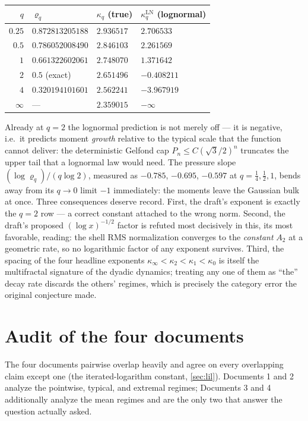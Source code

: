 \documentclass[11pt,oneside]{article}
\theoremstyle{definition}
\theoremstyle{remark}
\begin{document}
\begin{center}
\small
\begin{tabular}{@{}rlll@{}}
\toprule
$q$ & $\varrho_q$ & $\kappa_q$ (true) & $\kappa_q^{\mathrm{LN}}$
(lognormal)\\
\midrule
$0.25$ & $0.872813205188$ & $2.936517$ & $2.706533$\\
$0.5$  & $0.786052008490$ & $2.846103$ & $2.261569$\\
$1$    & $0.661322602061$ & $2.748070$ & $1.371642$\\
$2$    & $0.5$ (exact)    & $2.651496$ & $-0.408211$\\
$4$    & $0.320194101601$ & $2.562241$ & $-3.967919$\\
$\infty$ & ---            & $2.359015$ & $-\infty$\\
\bottomrule
\end{tabular}
\end{center}

Already at $q=2$ the lognormal prediction is not merely off --- it is
negative, i.e.\ it predicts moment \emph{growth} relative to the
typical scale that the function cannot deliver: the deterministic
Gelfond cap $P_n\le C(\sqrt3/2)^n$ truncates the upper tail that a
lognormal law would need.  The pressure slope
$(\log\varrho_q)/(q\log2)$, measured as $-0.785$, $-0.695$,
$-0.597$ at $q=\tfrac14,\tfrac12,1$, bends away from its $q\to0$ limit
$-1$ immediately: the moments leave the Gaussian bulk at once.  Three
consequences deserve record.  First, the draft's exponent is exactly
the $q=2$ row --- a correct constant attached to the wrong norm.
Second, the draft's proposed $(\log x)^{-1/2}$ factor is refuted most
decisively in this, its most favorable, reading: the shell RMS
normalization converges to the \emph{constant} $A_2$ at a geometric
rate, so no logarithmic factor of any exponent survives.  Third, the
spacing of the four headline exponents
$\kappa_\infty<\kappa_2<\kappa_1<\kappa_0$ is itself the multifractal
signature of the dyadic dynamics; treating any one of them as ``the''
decay rate discards the others' regimes, which is precisely the
category error the original conjecture made.

\section{Audit of the four documents}
\label{sec:audit}

The four documents pairwise overlap heavily and agree on every overlapping
claim except one (the iterated-logarithm constant, \cref{sec:lil}).
Documents 1 and 2 analyze the pointwise, typical, and extremal regimes;
Documents 3 and 4 additionally analyze the mean regimes and are the only
two that answer the question actually asked.
\end{document}
